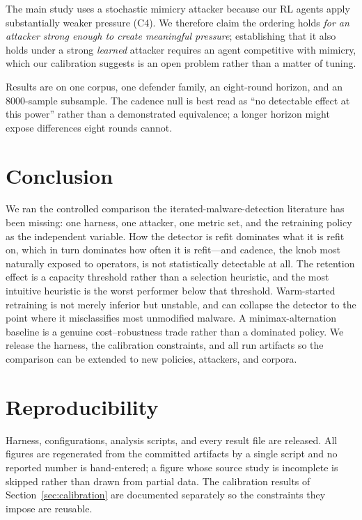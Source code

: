 \documentclass[conference]{IEEEtran}
\begin{document}
The main study uses a stochastic mimicry attacker because our RL agents apply
substantially weaker pressure (C4). We therefore claim the ordering holds
\emph{for an attacker strong enough to create meaningful pressure};
establishing that it also holds under a strong \emph{learned} attacker requires
an agent competitive with mimicry, which our calibration suggests is an open
problem rather than a matter of tuning.

Results are on one corpus, one defender family, an eight-round horizon, and an
$8000$-sample subsample. The cadence null is best read as ``no detectable
effect at this power'' rather than a demonstrated equivalence; a longer horizon
might expose differences eight rounds cannot.

\section{Conclusion}

We ran the controlled comparison the iterated-malware-detection literature has
been missing: one harness, one attacker, one metric set, and the retraining
policy as the independent variable. How the detector is refit dominates what it
is refit on, which in turn dominates how often it is refit---and cadence, the
knob most naturally exposed to operators, is not statistically detectable at
all. The retention effect is a capacity threshold rather than a selection
heuristic, and the most intuitive heuristic is the worst performer below that
threshold. Warm-started retraining is not merely inferior but unstable, and can
collapse the detector to the point where it misclassifies most unmodified
malware. A minimax-alternation baseline is a genuine cost--robustness trade
rather than a dominated policy. We release the harness, the calibration
constraints, and all run artifacts so the comparison can be extended to new
policies, attackers, and corpora.

\section*{Reproducibility}

Harness, configurations, analysis scripts, and every result file are released.
All figures are regenerated from the committed artifacts by a single script and
no reported number is hand-entered; a figure whose source study is incomplete
is skipped rather than drawn from partial data. The calibration results of
Section~\ref{sec:calibration} are documented separately so the constraints they
impose are reusable.
\end{document}

